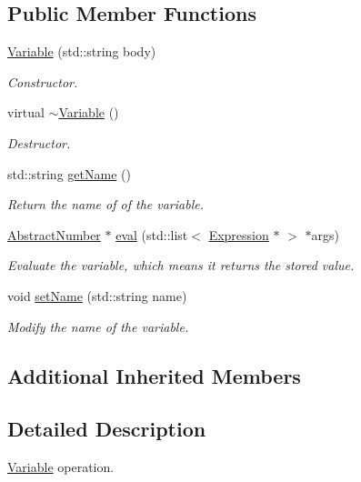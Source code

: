 \subsection*{Public Member Functions}
\begin{DoxyCompactItemize}
\item 
\hyperlink{class_variable_a1b8d28ae922899a73e8f2618493bd241}{Variable} (std\-::string body)
\begin{DoxyCompactList}\small\item\em Constructor. \end{DoxyCompactList}\item 
\hypertarget{class_variable_acfc14d0ad77af53025f890b4d3a7745a}{virtual \hyperlink{class_variable_acfc14d0ad77af53025f890b4d3a7745a}{$\sim$\-Variable} ()}\label{class_variable_acfc14d0ad77af53025f890b4d3a7745a}

\begin{DoxyCompactList}\small\item\em Destructor. \end{DoxyCompactList}\item 
std\-::string \hyperlink{class_variable_a63939a8fe4fafe25bb175df35058a6ba}{get\-Name} ()
\begin{DoxyCompactList}\small\item\em Return the name of of the variable. \end{DoxyCompactList}\item 
\hyperlink{class_abstract_number}{Abstract\-Number} $\ast$ \hyperlink{class_variable_a3901741ec3ce0e39923765a8b349c615}{eval} (std\-::list$<$ \hyperlink{class_expression}{Expression} $\ast$ $>$ $\ast$args)
\begin{DoxyCompactList}\small\item\em Evaluate the variable, which means it returns the stored value. \end{DoxyCompactList}\item 
void \hyperlink{class_variable_a3ed8ef37889876fa12fa2fcc0f65512d}{set\-Name} (std\-::string name)
\begin{DoxyCompactList}\small\item\em Modify the name of the variable. \end{DoxyCompactList}\end{DoxyCompactItemize}
\subsection*{Additional Inherited Members}


\subsection{Detailed Description}
\hyperlink{class_variable}{Variable} operation. 

